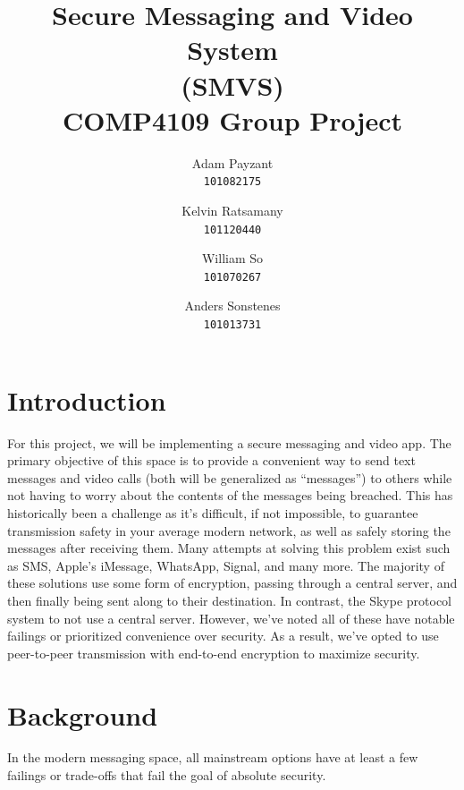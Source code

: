 \documentclass[titlepage]{article}
\title{Secure Messaging and Video System \\
    (SMVS) \\
    \large COMP4109 Group Project
}
\author{Adam Payzant \\
    \texttt{101082175} \\
    \and
    Kelvin Ratsamany \\
    \texttt{101120440}
    \and
    William So \\
    \texttt{101070267} \\
    \and
    Anders Sonstenes \\
    \texttt{101013731}
}
\begin{document}
    \maketitle

    \section{Introduction}

      For this project, we will be implementing a secure messaging and video app.
      The primary objective of this space is to provide a convenient way to send text messages and video calls (both will be generalized as ``messages'') to others while not having to worry about the contents of the messages being breached.
      This has historically been a challenge as it's difficult, if not impossible, to guarantee transmission safety in your average modern network, as well as safely storing the messages after receiving them.
      Many attempts at solving this problem exist such as SMS, Apple's iMessage, WhatsApp, Signal, and many more.
      The majority of these solutions use some form of encryption, passing through a central server, and then finally being sent along to their destination.
      In contrast, the Skype protocol system to not use a central server.
      However, we've noted all of these have notable failings or prioritized convenience over security.
      As a result, we've opted to use peer-to-peer transmission with end-to-end encryption to maximize security.

    \section{Background}

      In the modern messaging space, all mainstream options have at least a few failings or trade-offs that fail the goal of absolute security.
\end{document}

